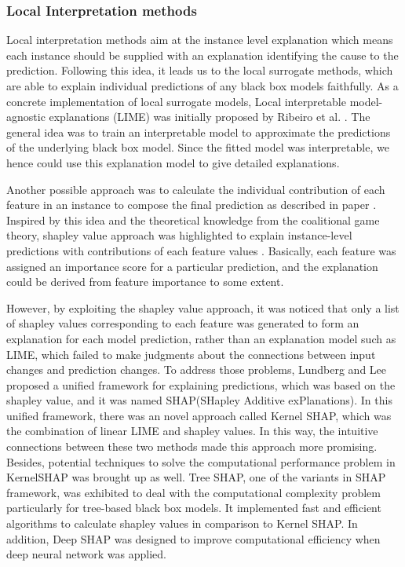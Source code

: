 
\subsubsection{Local Interpretation methods}
Local interpretation methods aim at the instance level explanation which means each instance should be supplied with an explanation identifying the cause to the prediction. Following this idea, it leads us to the local surrogate methods, which are able to explain individual predictions of any black box models faithfully. As a concrete implementation of local surrogate models, Local interpretable model-agnostic explanations (LIME) was initially proposed by Ribeiro et al. \cite{ribeiro2016should}. The general idea was to train an interpretable model to approximate the predictions of the underlying black box model. Since the fitted model was interpretable, we hence could use this explanation model to give detailed explanations.

Another possible approach was to calculate the individual contribution of each feature in an instance to compose the final prediction as described in paper \cite{robnik2008explaining}. Inspired by this idea and the theoretical knowledge from the coalitional game theory, shapley value approach was highlighted to explain instance-level predictions with contributions of each feature values \cite{kononenko2010efficient}. Basically, each feature was assigned an importance score for a particular prediction, and the explanation could be derived from feature importance to some extent. 

However, by exploiting the shapley value approach, it was noticed that only a list of shapley values corresponding to each feature was generated to form an explanation for each model prediction, rather than an explanation model such as LIME, which failed to make judgments about the connections between input changes and prediction changes. To address those problems, Lundberg and Lee \cite{lundberg2017unified} proposed a unified framework for explaining predictions, which was based on the shapley value, and it was named SHAP(SHapley Additive exPlanations). In this unified framework, there was an novel approach called Kernel SHAP, which was the combination of linear LIME and shapley values. In this way, the intuitive connections between these two methods made this approach more promising. Besides, potential techniques to solve the computational performance problem in KernelSHAP was brought up as well. Tree SHAP, one of the variants in SHAP framework, was exhibited to deal with the computational complexity problem particularly for tree-based black box models. It implemented fast and efficient algorithms to calculate shapley values in comparison to Kernel SHAP. In addition, Deep SHAP was designed to improve computational efficiency when deep neural network was applied.


